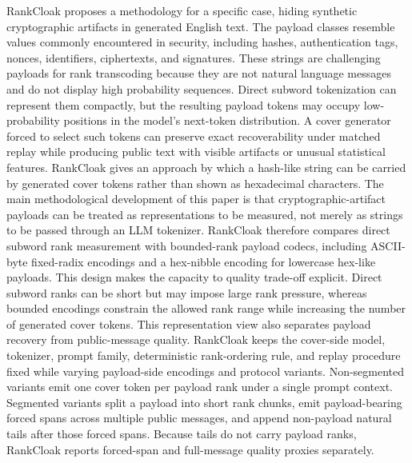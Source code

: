 \documentclass[fleqn,10pt]{wlscirep}
\begin{document}
RankCloak proposes a methodology for a specific case, hiding synthetic cryptographic artifacts in generated English text. The payload classes resemble values commonly encountered in security, including hashes, authentication tags, nonces, identifiers, ciphertexts, and signatures\cite{NIST2015SecureHashStandard,Josefsson2006RFC4648,DavisPeabodyLeach2024RFC9562}. These strings are challenging payloads for rank transcoding because they are not natural language messages and do not display high probability sequences. Direct subword tokenization can represent them compactly, but the resulting payload tokens may occupy low-probability positions in the model's next-token distribution\cite{Sennrich2016SubwordUnits,KudoRichardson2018SentencePiece}. A cover generator forced to select such tokens can preserve exact recoverability under matched replay while producing public text with visible artifacts or unusual statistical features. RankCloak gives an approach by which a hash-like string can be carried by generated cover tokens rather than shown as hexadecimal characters. The main methodological development of this paper is that cryptographic-artifact payloads can be treated as representations to be measured, not merely as strings to be passed through an LLM tokenizer. RankCloak therefore compares direct subword rank measurement with bounded-rank payload codecs, including ASCII-byte fixed-radix encodings and a hex-nibble encoding for lowercase hex-like payloads. This design makes the capacity to quality trade-off explicit. Direct subword ranks can be short but may impose large rank pressure, whereas bounded encodings constrain the allowed rank range while increasing the number of generated cover tokens. This representation view also separates payload recovery from public-message quality. RankCloak keeps the cover-side model, tokenizer, prompt family, deterministic rank-ordering rule, and replay procedure fixed while varying payload-side encodings and protocol variants. Non-segmented variants emit one cover token per payload rank under a single prompt context. Segmented variants split a payload into short rank chunks, emit payload-bearing forced spans across multiple public messages, and append non-payload natural tails after those forced spans. Because tails do not carry payload ranks, RankCloak reports forced-span and full-message quality proxies separately.
\end{document}

